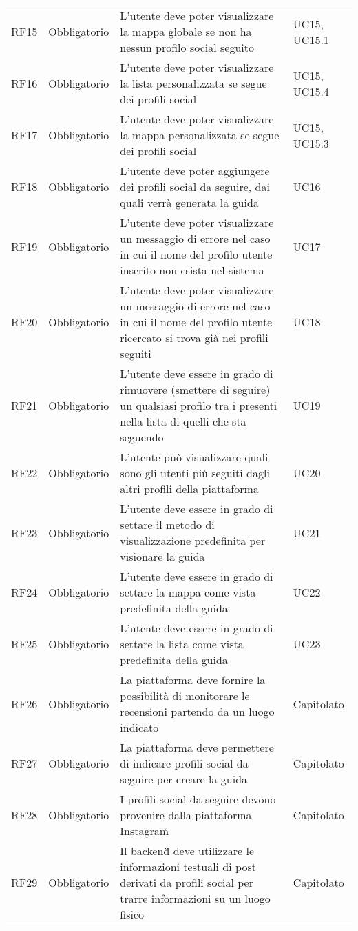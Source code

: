 {\begin{longtable}{C{.15\freewidth} C{.2\freewidth} C{.528\freewidth} C{.15\freewidth}}
      RF15 & Obbligatorio & L'utente deve poter visualizzare la mappa globale se non ha nessun profilo social seguito & UC15, UC15.1 \\
      RF16 & Obbligatorio & L'utente deve poter visualizzare la lista personalizzata se segue dei profili social & UC15, UC15.4 \\
      RF17 & Obbligatorio & L'utente deve poter visualizzare la mappa personalizzata se segue dei profili social & UC15, UC15.3 \\
      RF18 & Obbligatorio & L'utente deve poter aggiungere dei profili social da seguire, dai quali verrà generata la guida & UC16 \\
      RF19 & Obbligatorio & L'utente deve poter visualizzare un messaggio di errore nel caso in cui il nome del profilo utente inserito non esista nel sistema & UC17 \\
      RF20 & Obbligatorio & L'utente deve poter visualizzare un messaggio di errore nel caso in cui il nome del profilo utente ricercato si trova già nei profili seguiti & UC18 \\
      RF21 & Obbligatorio & L'utente deve essere in grado di rimuovere (smettere di seguire) un qualsiasi profilo tra i presenti nella lista di quelli che sta seguendo  & UC19 \\
      RF22 & Obbligatorio & L'utente può visualizzare quali sono gli utenti più seguiti dagli altri profili della piattaforma & UC20 \\
      RF23 & Obbligatorio & L'utente deve essere in grado di settare il metodo di visualizzazione predefinita per visionare la guida & UC21 \\
      RF24 & Obbligatorio & L'utente deve essere in grado di settare la mappa come vista predefinita della guida & UC22 \\
      RF25 & Obbligatorio & L'utente deve essere in grado di settare la lista come vista predefinita della guida & UC23 \\	
      RF26 & Obbligatorio & La piattaforma deve fornire la possibilità di monitorare le recensioni partendo da un luogo indicato & Capitolato \\
      RF27 & Obbligatorio & La piattaforma deve permettere di indicare profili social da seguire per creare la guida & Capitolato \\
      RF28 & Obbligatorio & I profili social da seguire devono provenire dalla piattaforma Instagram\G{} & Capitolato \\   
      RF29 & Obbligatorio & Il backend\G{} deve utilizzare le informazioni testuali di post derivati da profili social per trarre informazioni su un luogo fisico & Capitolato \\

\end{longtable}}
